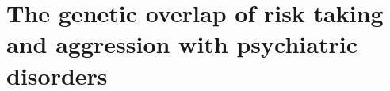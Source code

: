 \chapter{The genetic overlap of risk taking and aggression with psychiatric disorders}
\label{ukb_corr}



%
